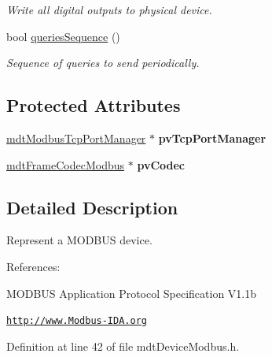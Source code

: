 \begin{DoxyCompactItemize}
\begin{DoxyCompactList}\small\item\em Write all digital outputs to physical device. \end{DoxyCompactList}\item 
bool \hyperlink{classmdt_device_modbus_a3b83b926ed1f9c3bdf7024de2745c285}{queriesSequence} ()
\begin{DoxyCompactList}\small\item\em Sequence of queries to send periodically. \end{DoxyCompactList}\end{DoxyCompactItemize}
\subsection*{Protected Attributes}
\begin{DoxyCompactItemize}
\item 
\hypertarget{classmdt_device_modbus_a9ecbac63c29b229ab01f5fdb26008c95}{
\hyperlink{classmdt_modbus_tcp_port_manager}{mdtModbusTcpPortManager} $\ast$ {\bfseries pvTcpPortManager}}
\label{classmdt_device_modbus_a9ecbac63c29b229ab01f5fdb26008c95}

\item 
\hypertarget{classmdt_device_modbus_a2171d37ea720d546934f1c841e3c4d26}{
\hyperlink{classmdt_frame_codec_modbus}{mdtFrameCodecModbus} $\ast$ {\bfseries pvCodec}}
\label{classmdt_device_modbus_a2171d37ea720d546934f1c841e3c4d26}

\end{DoxyCompactItemize}


\subsection{Detailed Description}
Represent a MODBUS device. 

References:
\begin{DoxyItemize}
\item MODBUS Application Protocol Specification V1.1b
\item \href{http://www.Modbus-IDA.org}{\tt http://www.Modbus-\/IDA.org} 
\end{DoxyItemize}

Definition at line 42 of file mdtDeviceModbus.h.



